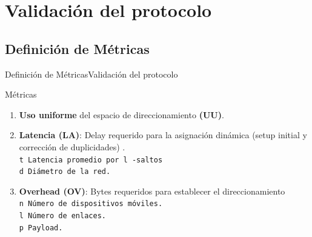 \section{Validación del protocolo}
\subsection{Definición de Métricas}
\begin{frame}{Definición de Métricas}{Validación del protocolo}
\begin{block}{Métricas}
    \begin{enumerate}
    \justifying
        \item \textbf{Uso uniforme} del espacio de direccionamiento \textbf{(UU)}.\\ 
        \item \textbf{Latencia (LA)}: Delay requerido para la asignación dinámica (setup initial y corrección de duplicidades) \cite{DATMANET}.\\
        {\tt t Latencia promedio por l -saltos\\
        d Diámetro de la red.}\\
        \item \textbf{Overhead (OV)}: Bytes requeridos para establecer el direccionamiento \cite{EvalSelf}\\
        {\tt n Número de dispositivos móviles.\\
        l Número de enlaces.\\
        p Payload.}
    \end{enumerate}
  \end{block}
\end{frame}
